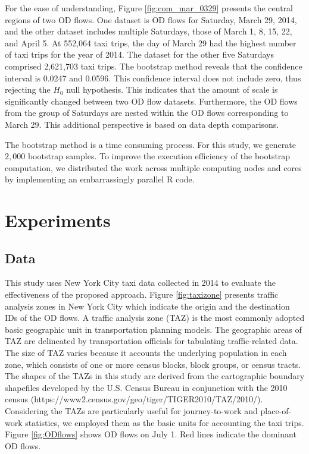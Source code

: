 \documentclass[a4paper,UKenglish]{lipics-v2018}
\begin{document}
For the ease of understanding, Figure \ref{fig:com_mar_0329} presents the central regions of two OD flows.
One dataset is OD flows for Saturday, March 29, 2014, and the other dataset includes multiple Saturdays, those of March 1, 8, 15, 22, and April 5.
At 552,064 taxi trips, the day of March 29 had the highest number of taxi trips for the year of 2014.
The dataset for the other five Saturdays comprised 2,621,703 taxi trips.
The bootstrap method reveals that the confidence interval is 0.0247 and 0.0596.
This confidence interval does not include zero, thus rejecting the $H_0$ null hypothesis.
This indicates that the amount of scale is significantly changed between two OD flow datasets.
Furthermore, the OD flows from the group of Saturdays are nested within the OD flows corresponding to March 29. This additional perspective is based on data depth comparisons. 

The bootstrap method is a time consuming process.
For this study, we generate $2,000$ bootstrap samples.
To improve the execution efficiency of the bootstrap computation, we distributed the work across multiple computing nodes and cores by implementing an embarrassingly parallel R code. 


\section{Experiments}
\label{sec:experiments}

\subsection{Data}
This study uses New York City taxi data collected in 2014 to evaluate the effectiveness of the proposed approach.
Figure \ref{fig:taxizone} presents traffic analysis zones in New York City which indicate the origin and the destination IDs of the OD flows. 
A traffic analysis zone (TAZ) is the most commonly adopted basic geographic unit in transportation planning models.
The geographic areas of TAZ are delineated by transportation officials for tabulating traffic-related data.
The size of TAZ varies because it accounts the underlying population in each zone, which consists of one or more census blocks, block groups, or census tracts.
The shapes of the TAZs in this study are derived from the cartographic boundary shapefiles developed by the U.S. Census Bureau in conjunction with the 2010 census (https://www2.census.gov/geo/tiger/TIGER2010/TAZ/2010/).
Considering the TAZs are particularly useful for journey-to-work and place-of-work statistics, we employed them as the basic units for accounting the taxi trips. 
Figure \ref{fig:ODflows} shows OD flows on July 1.
Red lines indicate the dominant OD flows.
\end{document}
